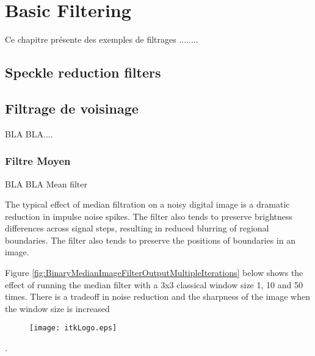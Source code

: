 \chapter{Basic Filtering}

Ce chapitre pr\'{e}sente des exemples de filtrages ........


\section{Speckle reduction filters}
\label{sec:SpeckleFilters}
\ifitkFullVersion

\fi


\section{Filtrage de voisinage}
\label{sec:NeighborhoodFilters}

BLA BLA....


\subsection{Filtre Moyen}
\label{sec:MeanFilter}

\ifitkFullVersion

\fi

BLA BLA Mean filter


The typical effect of median filtration on a noisy digital image is a dramatic reduction in impulse noise spikes. The filter also tends to preserve brightness differences across signal steps, resulting in reduced blurring of regional boundaries. The filter also tends to preserve the positions of boundaries in an image.

Figure \ref{fig:BinaryMedianImageFilterOutputMultipleIterations} below shows the effect of running the median filter with a 3x3 classical window size 
1, 10 and 50 times. There is a tradeoff in noise reduction and the sharpness of the image when the window size is increased\begin{figure}
  \center
  \texttt{[image: itkLogo.eps]}
  \label{fig:itkLogo}
\end{figure}.



